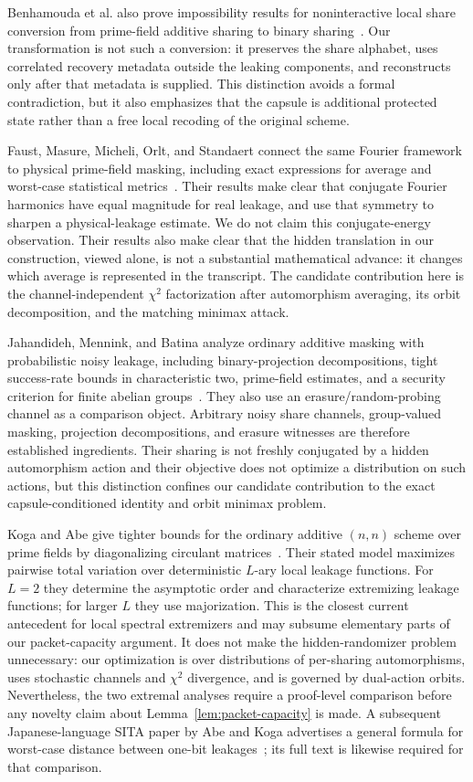 \documentclass[11pt]{article}
\theoremstyle{definition}
\newcommand{\chitwo}{\chi^2}
\begin{document}
Benhamouda et al. also prove impossibility results for noninteractive local share
conversion from prime-field additive sharing to binary sharing~\cite{bdir18}.
Our transformation is not such a conversion: it preserves the share alphabet,
uses correlated recovery metadata outside the leaking components, and reconstructs
only after that metadata is supplied.  This distinction avoids a formal
contradiction, but it also emphasizes that the capsule is additional protected
state rather than a free local recoding of the original scheme.

Faust, Masure, Micheli, Orlt, and Standaert connect the same Fourier framework to
physical prime-field masking, including exact expressions for average and
worst-case statistical metrics~\cite{faust24practice}.  Their results make clear
that conjugate Fourier harmonics have equal magnitude for real leakage, and use
that symmetry to sharpen a physical-leakage estimate.  We do not claim this
conjugate-energy observation.  Their results also make clear
that the hidden translation in our construction, viewed alone, is not a
substantial mathematical advance: it changes which average is represented in
the transcript.  The candidate contribution here is the channel-independent
$\chitwo$ factorization after automorphism averaging, its orbit decomposition,
and the matching minimax attack.

Jahandideh, Mennink, and Batina analyze ordinary additive masking with
probabilistic noisy leakage, including binary-projection decompositions, tight
success-rate bounds in characteristic two, prime-field estimates, and a security
criterion for finite abelian groups~\cite{jahandideh25decomposition}.  They also
use an erasure/random-probing channel as a comparison object.  Arbitrary noisy
share channels, group-valued masking, projection decompositions, and erasure
witnesses are therefore established ingredients.  Their sharing is not freshly
conjugated by a hidden automorphism action and their objective does not optimize
a distribution on such actions, but this distinction confines our candidate
contribution to the exact capsule-conditioned identity and orbit minimax problem.

Koga and Abe give tighter bounds for the ordinary additive $(n,n)$ scheme over
prime fields by diagonalizing circulant matrices~\cite{koga25circulant}.  Their
stated model maximizes pairwise total variation over deterministic $L$-ary local
leakage functions.  For $L=2$ they determine the asymptotic order and
characterize extremizing leakage functions; for larger $L$ they use
majorization.  This is the closest current antecedent for local spectral
extremizers and may subsume elementary parts of our packet-capacity argument.
It does not make the hidden-randomizer problem unnecessary: our optimization is
over distributions of per-sharing automorphisms, uses stochastic channels and
$\chitwo$ divergence, and is governed by dual-action orbits.  Nevertheless, the
two extremal analyses require a proof-level comparison before any novelty claim
about Lemma~\ref{lem:packet-capacity} is made.  A subsequent Japanese-language
SITA paper by Abe and Koga advertises a general formula for worst-case distance
between one-bit leakages~\cite{abe25general}; its full text is likewise required
for that comparison.
\end{document}

